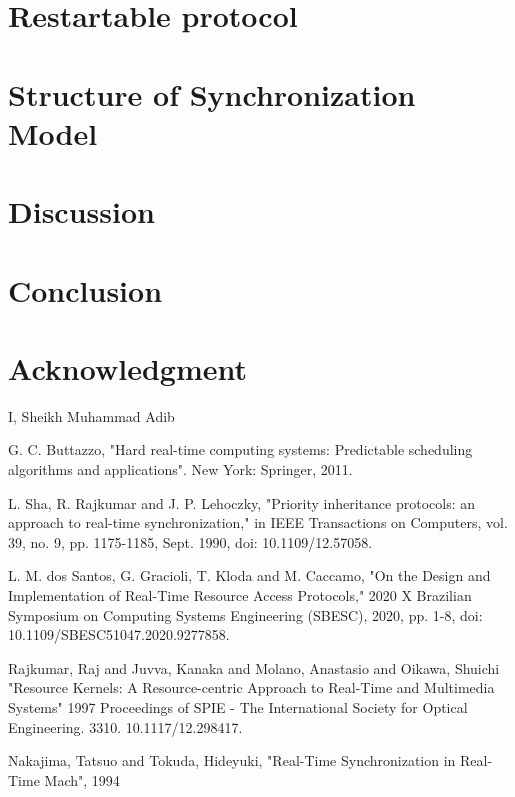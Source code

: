 \documentclass[conference]{IEEEtran}
\begin{document}
\section{Restartable protocol}



\section{Structure of Synchronization Model}

\section{Discussion}

\section{Conclusion}

\section*{Acknowledgment}

I, Sheikh Muhammad Adib 

\begin{thebibliography}{00}
 G. C. Buttazzo, "Hard real-time computing systems: Predictable scheduling algorithms and applications". New York: Springer, 2011. 

 L. Sha, R. Rajkumar and J. P. Lehoczky, "Priority inheritance protocols: an approach to real-time synchronization," in IEEE Transactions on Computers, vol. 39, no. 9, pp. 1175-1185, Sept. 1990, doi: 10.1109/12.57058.

 L. M. dos Santos, G. Gracioli, T. Kloda and M. Caccamo, "On the Design and Implementation of Real-Time Resource Access Protocols," 2020 X Brazilian Symposium on Computing Systems Engineering (SBESC), 2020, pp. 1-8, doi: 10.1109/SBESC51047.2020.9277858.

 Rajkumar, Raj and Juvva, Kanaka and Molano, Anastasio and Oikawa, Shuichi "Resource Kernels: A Resource-centric Approach to Real-Time and Multimedia Systems" 1997 Proceedings of SPIE - The International Society for Optical Engineering. 3310. 10.1117/12.298417. 

 Nakajima, Tatsuo and Tokuda, Hideyuki, "Real-Time Synchronization in Real-Time Mach", 1994 
\end{thebibliography}
\end{document}
